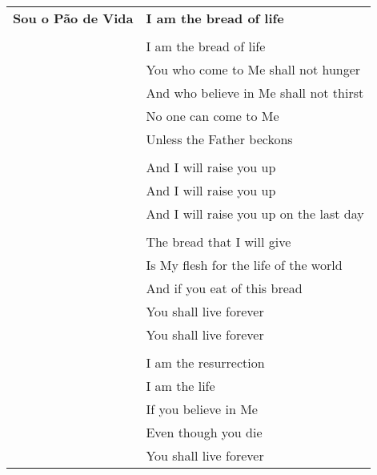 \begin{longtable}{L{1.7in}R{1.7in}}
  {\bf Sou o Pão de Vida} & {\bf I am the bread of life}\\
  & \\
  &I am the bread of life\\
  &You who come to Me shall not hunger\\
  &And who believe in Me shall not thirst\\
  &No one can come to Me\\
  &Unless the Father beckons\\
  &\\
  & {And I will raise you up}\\
  & {And I will raise you up}\\
  & {And I will raise you up on the last day}\\
 & \\
  & The bread that I will give\\
  & Is My flesh for the life of the world\\
  & And if you eat of this bread\\
  & You shall live forever\\
  & You shall live forever\\
  & \\
  & I am the resurrection\\
  & I am the life\\
  & If you believe in Me\\
  & Even though you die\\
  & You shall live forever\\
\end{longtable}

\newpage

\centering
{}

